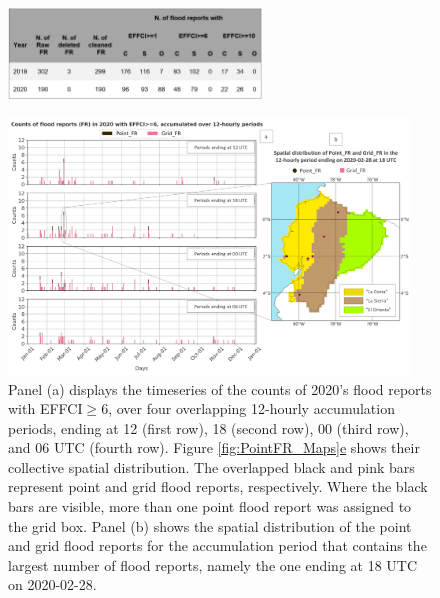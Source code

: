 \documentclass[techmemo]{ecmwfrep}%
\begin{document}
\begin{figure}
\centering
{}
\includegraphics[width=0.6\textwidth]{Tables/01_CountFR_EFFCI.png}
\label{table:CountFR_EFFCI}
\end{figure}

\begin{figure}
\centering
\includegraphics[width=0.95\textwidth]{Figures/03_DATA_Distribution_PointFR_GridFR.png}
\caption{Panel (a) displays the timeseries of the counts of 2020’s flood reports with EFFCI$\geq$6, over four overlapping 12-hourly accumulation periods, ending at 12 (first row), 18 (second row), 00 (third row), and 06 UTC (fourth row). Figure \ref{fig:PointFR_Maps}\hyperref[fig:PointFR_Maps]{e} shows their collective spatial distribution. The overlapped black and pink bars represent point and grid flood reports, respectively. Where the black bars are visible, more than one point flood report was assigned to the grid box. Panel (b) shows the spatial distribution of the point and grid flood reports for the accumulation period that contains the largest number of flood reports, namely the one ending at 18 UTC on 2020-02-28.}
\label{fig:Distr_PointFF}
\end{figure}
\end{document}

